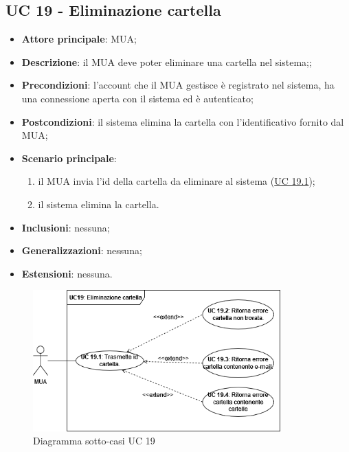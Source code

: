\subsection{UC 19 - Eliminazione cartella} \label{sec:UC19}
    \begin{itemize}
        \item \textbf{Attore principale}: MUA;
        \item \textbf{Descrizione}: il MUA deve poter eliminare una cartella nel sistema;;
        \item \textbf{Precondizioni}: l’account che il MUA gestisce è registrato nel sistema, ha una connessione aperta con il sistema ed è autenticato;
        \item \textbf{Postcondizioni}: il sistema elimina la cartella con l'identificativo fornito dal MUA;
        \item \textbf{Scenario principale}:
            \begin{enumerate}
                \item il MUA invia l'id della cartella da eliminare al sistema (\hyperref[sec:UC19.1]{UC 19.1});
                \item il sistema elimina la cartella.
            \end{enumerate}
        \item \textbf{Inclusioni}: nessuna;
        \item \textbf{Generalizzazioni}: nessuna;
        \item \textbf{Estensioni}: nessuna.
    \end{itemize}

\begin{figure}[h]
    \includegraphics[width=0.85\textwidth]{sections/uc_imgs/UC19.png}
    \centering
    \caption{Diagramma sotto-casi UC 19}
\end{figure}

